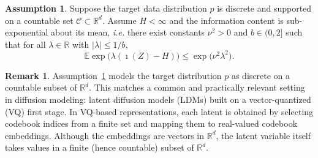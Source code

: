\documentclass[11pt]{article}
\newcommand{\info}{\imath}         %
\theoremstyle{definition}
\newtheorem{remark}{Remark}
\newtheorem{assumption}{Assumption}
\newcommand{\R}{\mathbb{R}}
\numberwithin{equation}{section}
\begin{document}
\begin{assumption}\label{assumption}
Suppose the target data distribution $p$ is discrete and supported on a countable set \(\mathcal C\subset\R^d\). 
Assume $H<\infty$ and the information content is sub-exponential about its mean, \textit{i.e.}
there exist constants $\nu^2>0$ and $b\in(0,2]$ such that for all
$\lambda\in\R$ with $|\lambda|\le 1/b$,
\begin{equation}\tag{SE}\label{eq:SE-again}
\mathbb E\exp\big(\lambda(\info(Z)-H)\big)
\le \exp\big(\nu^2\lambda^2\big).
\end{equation}
\end{assumption}


\begin{remark}


Assumption~\ref{assumption} models the target distribution $p$ as discrete on a countable subset of
$\mathbb{R}^d$. This matches a common and practically relevant setting in diffusion modeling: latent diffusion
models (LDMs) built on a vector-quantized (VQ) first stage. In VQ-based representations, each latent is obtained
by selecting codebook indices from a finite set and mapping them to real-valued codebook embeddings. Although the
embeddings are vectors in $\mathbb{R}^d$, the latent variable itself takes values in a finite (hence countable)
subset of $\mathbb{R}^d$.
\end{remark}
\end{document}
